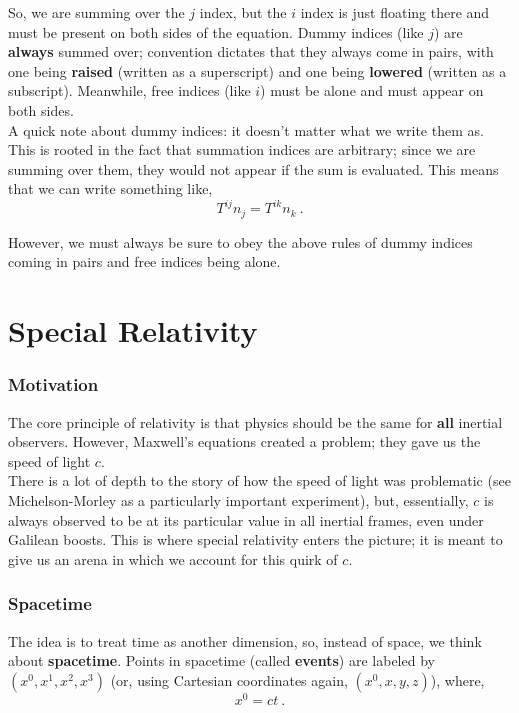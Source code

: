 \documentclass[11pt]{article}
\begin{document}
So, we are summing over the $j$ index, but the $i$ index is just floating there and must be present on both sides of the equation. Dummy indices (like $j$) are \textbf{always} summed over; convention dictates that they always come in pairs, with one being \textbf{raised} (written as a superscript) and one being \textbf{lowered} (written as a subscript). Meanwhile, free indices (like $i$) must be alone and must appear on both sides.\\

A quick note about dummy indices: it doesn't matter what we write them as. This is rooted in the fact that summation indices are arbitrary; since we are summing over them, they would not appear if the sum is evaluated. This means that we can write something like,
\begin{equation}
T^{ij}n_j = T^{ik}n_k\ .
\end{equation}

However, we must always be sure to obey the above rules of dummy indices coming in pairs and free indices being alone.

\part{Special Relativity}

\section{Motivation}

The core principle of relativity is that physics should be the same for \textbf{all} inertial observers. However, Maxwell's equations created a problem; they gave us the speed of light $c$.\\

There is a lot of depth to the story of how the speed of light was problematic (see Michelson-Morley as a particularly important experiment), but, essentially, $c$ is always observed to be at its particular value in all inertial frames, even under Galilean boosts. This is where special relativity enters the picture; it is meant to give us an arena in which we account for this quirk of $c$.

\section{Spacetime}

The idea is to treat time as another dimension, so, instead of space, we think about \textbf{spacetime}. Points in spacetime (called \textbf{events}) are labeled by $(x^0,x^1,x^2,x^3)$ (or, using Cartesian coordinates again, $(x^0,x,y,z)$), where,
\begin{equation}
x^0 = ct\ .
\end{equation}
\end{document}
